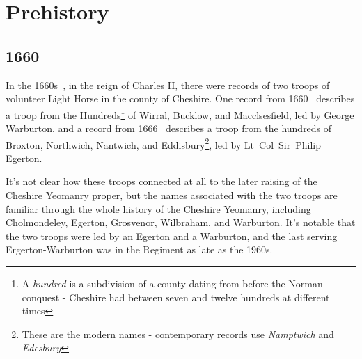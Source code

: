 \chapter*{Prehistory}

\section*{1660}

In the 1660s~\cite[p3]{leary}, in the reign of Charles II, there were records of two troops of volunteer Light Horse in the county of Cheshire. One record from 1660~\cite[p289]{leary} describes a troop from the Hundreds\footnote{A \emph{hundred} is a subdivision of a county dating from before the Norman conquest - Cheshire had between seven and twelve hundreds at different times} of Wirral, Bucklow, and Macclsesfield, led by George Warburton, and a record from 1666~\cite[p285]{leary} describes a troop from the hundreds of Broxton, Northwich, Nantwich, and Eddisbury\footnote{These are the modern names - contemporary records use \textit{Namptwich} and \textit{Edesbury}}, led by Lt~Col~Sir~Philip Egerton.

It's not clear how these troops connected at all to the later raising of the Cheshire Yeomanry proper, but the names associated with the two troops are familiar through the whole history of the Cheshire Yeomanry, including Cholmondeley, Egerton, Grosvenor, Wilbraham, and Warburton. It's notable that the two troops were led by an Egerton and a Warburton, and the last serving Ergerton-Warburton was in the Regiment as late as the 1960s.

